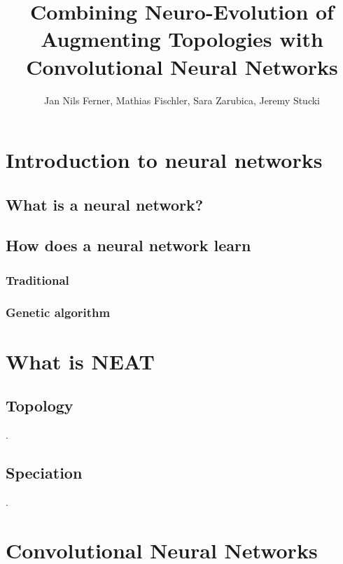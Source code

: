 \documentclass[11pt]{article}
\title{Combining Neuro-Evolution of Augmenting Topologies with Convolutional Neural Networks}
\author{Jan Nils Ferner, Mathias Fischler, Sara Zarubica, Jeremy Stucki}
\begin{document}
\maketitle
\newpage

\begin{abstract}

	\newpage

\end{abstract}

	\tableofcontents
	\newpage

	\section{Introduction to neural networks}
		\subsection{What is a neural network?}
			
		\subsection{How does a neural network learn}
			\subsubsection{Traditional}
				
			\subsubsection{Genetic algorithm}
				
	\newpage

	\section{What is NEAT}
		\subsection{Topology}
			.
		\subsection{Speciation}
			.
	\newpage

	\section{Convolutional Neural Networks}
\end{document}
